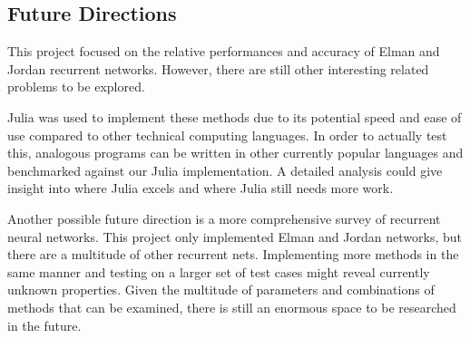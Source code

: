 \documentclass{article}
\begin{document}
\subsection{Future Directions}
This project focused on the relative performances and accuracy of Elman and Jordan recurrent networks.
However, there are still other interesting related problems to be explored.

Julia was used to implement these methods due to its potential speed and ease of use compared to other technical computing languages.
In order to actually test this, analogous programs can be written in other currently popular languages and benchmarked against our Julia implementation.
A detailed analysis could give insight into where Julia excels and where Julia still needs more work.

Another possible future direction is a more comprehensive survey of recurrent neural networks.
This project only implemented Elman and Jordan networks, but there are a multitude of other recurrent nets.
Implementing more methods in the same manner and testing on a larger set of test cases might reveal currently unknown properties.
Given the multitude of parameters and combinations of methods that can be examined, there is still an enormous space to be researched in the future.
\end{document}
